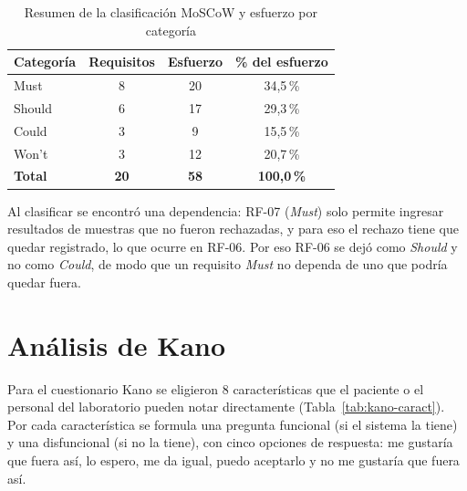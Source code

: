 \documentclass[11pt,a4paper]{article}
\begin{document}
\begin{table}[htbp]
\centering
\caption{Resumen de la clasificación MoSCoW y esfuerzo por categoría}\label{tab:moscow-resumen}
\begin{tabular}{|l|c|c|c|}
\hline
\textbf{Categoría} & \textbf{Requisitos} & \textbf{Esfuerzo} & \textbf{\% del esfuerzo}\\
\hline
Must & 8 & 20 & 34,5\,\%\\
\hline
Should & 6 & 17 & 29,3\,\%\\
\hline
Could & 3 & 9 & 15,5\,\%\\
\hline
Won't & 3 & 12 & 20,7\,\%\\
\hline
\textbf{Total} & \textbf{20} & \textbf{58} & \textbf{100,0\,\%}\\
\hline
\end{tabular}
\end{table}

Al clasificar se encontró una dependencia: RF-07 (\emph{Must}) solo permite ingresar resultados de muestras que no fueron rechazadas, y para eso el rechazo tiene que quedar registrado, lo que ocurre en RF-06. Por eso RF-06 se dejó como \emph{Should} y no como \emph{Could}, de modo que un requisito \emph{Must} no dependa de uno que podría quedar fuera.

\section{Análisis de Kano}
Para el cuestionario Kano se eligieron 8 características que el paciente o el personal del laboratorio pueden notar directamente (Tabla~\ref{tab:kano-caract}). Por cada característica se formula una pregunta funcional (si el sistema la tiene) y una disfuncional (si no la tiene), con cinco opciones de respuesta: me gustaría que fuera así, lo espero, me da igual, puedo aceptarlo y no me gustaría que fuera así.
\end{document}
